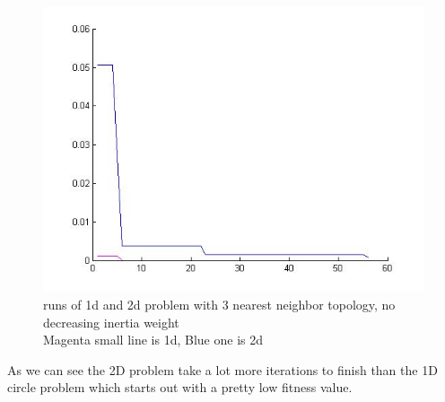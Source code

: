 \documentclass[12pt, a4paper]{article}
\begin{document}
\begin{figure}[H]

\includegraphics[width=\linewidth]{3nn_no_inertia}
\caption{runs of 1d and 2d problem with 3 nearest neighbor topology, no decreasing inertia weight\\
Magenta small line is 1d, Blue one is 2d}
\end{figure}
As we can see the 2D problem take a lot more iterations to finish than the 1D circle problem which starts out with a pretty low fitness value.
\end{document}
